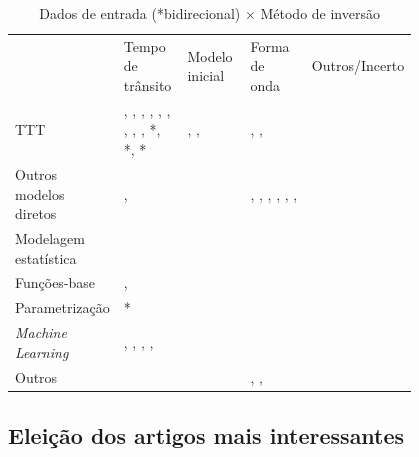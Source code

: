 \begin{table}[H]
	\def\seleccite{\bfseries}
	\centering
	\caption{Dados de entrada (*bidirecional) $\times$ Método de inversão}
	\label{table:cp_classif_metodo-vs-dados}
	\begin{tabular}{C{0.16\linewidth} C{0.16\linewidth} C{0.16\linewidth} C{0.16\linewidth} C{0.16\linewidth}}
		 & Tempo de trânsito & Modelo inicial & Forma de onda & Outros/Incerto \\\ttline
		TTT & \cite{bao_online_2020}, \cite{djikpesse_reducing_2010}, \cite{goyal_ultrasound_2025}, \cite{gras_practical_2022}, \cite{othmani_acoustic_2024}, \cite{shin_distributed_2022}, \cite{wo_firstarrival_2024}, \cite{zhang_optimization_2023}, \cite{mcmechan_application_1982}, \cite{ritter_water_2010}*, \cite{takeuchi_development_1993}*, \cite{vadapalli_application_2012}* & \cite{bao_online_2020}, \cite{shin_distributed_2022}, \cite{ritter_water_2010} & \cite{gras_practical_2022}, \cite{mcmechan_application_1982}, \cite{wellington_2d_2015} &  \\\tline
		Outros modelos diretos & \cite{gras_practical_2022}, \cite{li_multiscale_2024} & \cite{datta_fast_2019} & \cite{gras_practical_2022}, \cite{chapeland_highresolution_2022}, \cite{datta_fast_2019}, \cite{deluca_simultaneous_2022}, \cite{mallick_prediction_2022}, \cite{michalopoulou_environmental_2018}, \cite{zhang_inversion_2016} &  \\\tline
		Modelagem estatística & \cite{agata_bayesian_2023} & \cite{agata_bayesian_2023} &  & \cite{dosso_joint_2023} \\\tline
		Funções-base & \cite{yu_krylov_2021}, \cite{radhakrishnan_inversion_2024} &  & \cite{taroudakis_tomographic_2001} &  \\\tline
		Parametrização & \cite{wu_inversion_2023}* &  &  & \cite{carriere_featureoriented_2013} \\\tline
		\textit{Machine Learning} & \cite{agata_bayesian_2023}, \cite{jo_seismic_2023}, \cite{jo_seismic_2024}, \cite{mei_uncertainty_2025}, \cite{zhang_nonlinear_2022} & \cite{agata_bayesian_2023} & \cite{mallick_prediction_2022} &  \\\tline
		Outros & \cite{amini_joint_2016} & \cite{amini_joint_2016} & \cite{han_realtime_2014}, \cite{becker_geoacoustic_2007}, \cite{bender_threedimensional_2012} & \cite{mitchell_optical_2018}
	\end{tabular}
\end{table}

\endgroup

\subsection{Eleição dos artigos mais interessantes}

